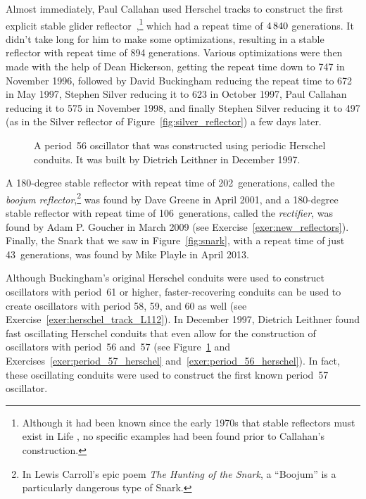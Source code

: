 Almost immediately, Paul Callahan used Herschel tracks to construct the first explicit stable glider reflector~\cite{BC98},\footnote{Although it had been known since the early 1970s that stable reflectors must exist in Life \cite{Wain74,BCG82}, no specific examples had been found prior to Callahan's construction.} which had a repeat time of $4{\,}840$ generations. It didn't take long for him to make some optimizations, resulting in a stable reflector with repeat time of 894 generations. Various optimizations were then made with the help of Dean Hickerson, getting the repeat time down to 747 in November 1996, followed by David Buckingham reducing the repeat time to 672 in May 1997, Stephen Silver reducing it to 623 in October 1997, Paul Callahan reducing it to 575 in November 1998, and finally Stephen Silver reducing it to 497 (as in the Silver reflector of Figure~\ref{fig:silver_reflector}) a few days later.

\begin{figure}[!htb]
	\centering{}
	\caption{A period~56 oscillator that was constructed using periodic Herschel conduits. It was built by Dietrich Leithner in December 1997.}\label{fig:period_56_herschel}
\end{figure}

A 180-degree stable reflector with repeat time of 202~generations, called the \emph{boojum reflector},\footnote{In Lewis Carroll's epic poem \emph{The Hunting of the Snark}, a ``Boojum'' is a particularly dangerous type of Snark.} was found by Dave Greene in April 2001, and a 180-degree stable reflector with repeat time of 106~generations, called the \emph{rectifier}, was found by Adam P. Goucher in March 2009 (see Exercise~\ref{exer:new_reflectors}). Finally, the Snark that we saw in Figure~\ref{fig:snark}, with a repeat time of just 43~generations, was found by Mike Playle in April 2013.

Although Buckingham's original Herschel conduits were used to construct oscillators with period~61 or higher, faster-recovering conduits can be used to create oscillators with period 58, 59, and 60 as well (see Exercise~\ref{exer:herschel_track_L112}). In December 1997, Dietrich Leithner found fast oscillating Herschel conduits that even allow for the construction of oscillators with period~56 and~57 (see Figure~\ref{fig:period_56_herschel} and Exercises~\ref{exer:period_57_herschel} and~\ref{exer:period_56_herschel}). In fact, these oscillating conduits were used to construct the first known period~57 oscillator. %

